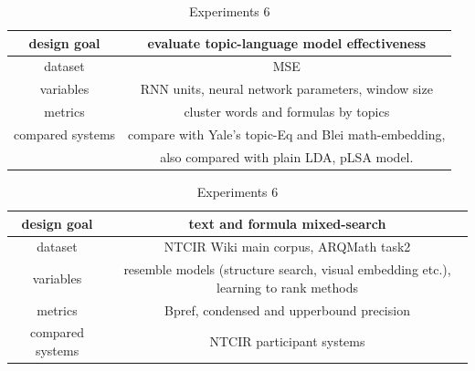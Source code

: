 \documentclass[11pt]{artikel3}
\begin{document}
\begin{table}

	\raggedright



    \caption{Experiments 5}

	\begin{tabular}{c|c}

		\hline

		design goal & evaluate topic-language model effectiveness \\

		\hline

		dataset & MSE  \\

	    \hline

		variables & RNN units, neural network parameters, window size \\

		\hline

		metrics & cluster words and formulas by topics \\

		\hline

		compared systems & compare with Yale's topic-Eq and Blei math-embedding, \\

		& also compared with plain LDA, pLSA model. \\

	\end{tabular}



	\vspace{1cm}

	\caption{Experiments 6}

	\begin{tabular}{c|c}

		\hline

		design goal & text and formula mixed-search \\

		\hline

		dataset & NTCIR Wiki main corpus, ARQMath task2 \\

	    \hline

		variables & resemble models (structure search, visual embedding etc.), learning to rank methods \\

		\hline

		metrics & Bpref, condensed and upperbound  precision \\

		\hline

		compared systems & NTCIR participant systems \\

	\end{tabular}



\end{table}
\end{document}
